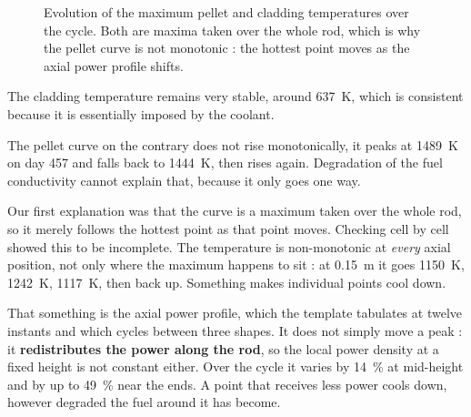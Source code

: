 \begin{figure}[htbp]
\centering
{}
\caption[Pellet and cladding temperatures over the cycle]{Evolution of the
maximum pellet and cladding temperatures over the cycle. Both are maxima taken
over the whole rod, which is why the pellet curve is not monotonic : the
hottest point moves as the axial power profile shifts.}
\label{fig:temp}
\end{figure}

The cladding temperature remains very stable, around \SI{637}{\kelvin},
which is consistent because it is essentially imposed by the coolant.

The pellet curve on the contrary does not rise monotonically, it peaks at \SI{1489}{\kelvin} on day
\num{457} and falls back to \SI{1444}{\kelvin}, then rises again. Degradation of
the fuel conductivity cannot explain that, because it only goes one way.

Our first explanation was that the curve is a maximum taken over the whole rod,
so it merely follows the hottest point as that point moves. Checking cell by
cell showed this to be incomplete. The temperature is non-monotonic at
\emph{every} axial position, not only where the maximum happens to sit : at
\SI{0.15}{\metre} it goes \SI{1150}{\kelvin}, \SI{1242}{\kelvin},
\SI{1117}{\kelvin}, then back up. Something makes individual points cool down.

That something is the axial power profile, which the template tabulates at
twelve instants and which cycles between three shapes. It does not simply move
a peak : it \textbf{redistributes the power along the rod}, so the local power
density at a fixed height is not constant either. Over the cycle it varies by
\SI{14}{\percent} at mid-height and by up to \SI{49}{\percent} near the ends.
A point that receives less power cools down, however degraded the fuel around it
has become.

